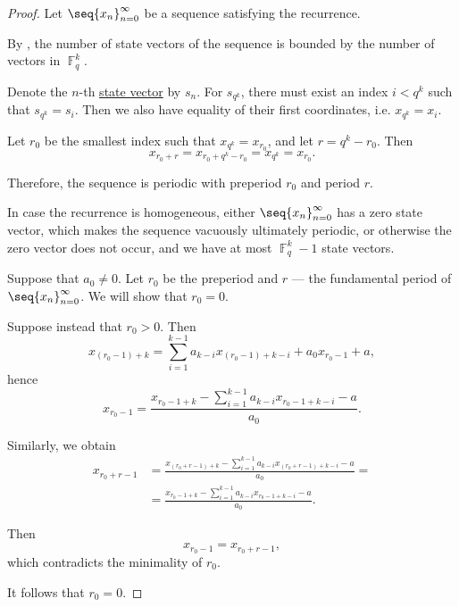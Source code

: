 \begin{proof}
  Let \( \seq{ x_n }_{n=0}^\infty \) be a sequence satisfying the recurrence.

   By , the number of state vectors of the sequence is bounded by the number of vectors in \( \BbbF_q^k \).

  Denote the \( n \)-th \hyperref[def:recurrence_relation/state]{state vector} by \( s_n \). For \( s_{q^k} \), there must exist an index \( i < q^k \) such that \( s_{q^k} = s_i \). Then we also have equality of their first coordinates, i.e. \( x_{q^k} = x_i \).

  Let \( r_0 \) be the smallest index such that \( x_{q^k} = x_{r_0} \), and let \( r = q^k - r_0 \). Then
  \begin{equation*}
    x_{r_0 + r} = x_{r_0 + q^k - r_0} = x_{q^k} = x_{r_0}.
  \end{equation*}

  Therefore, the sequence is periodic with preperiod \( r_0 \) and period \( r \).

   In case the recurrence is homogeneous, either \( \seq{ x_n }_{n=0}^\infty \) has a zero state vector, which makes the sequence vacuously ultimately periodic, or otherwise the zero vector does not occur, and we have at most \( \BbbF_q^k - 1 \) state vectors.

   Suppose that \( a_0 \neq 0 \). Let \( r_0 \) be the preperiod and \( r \) --- the fundamental period of \( \seq{ x_n }_{n=0}^\infty \). We will show that \( r_0 = 0 \).

  Suppose instead that \( r_0 > 0 \). Then
  \begin{equation*}
    x_{(r_0-1)+k} = \sum_{i=1}^{k-1} a_{k-i} x_{(r_0-1)+k-i} + a_0 x_{r_0-1} + a,
  \end{equation*}
  hence
  \begin{equation*}
    x_{r_0-1}
    =
    \frac {x_{r_0-1+k} - \sum_{i=1}^{k-1} a_{k-i} x_{r_0-1+k-i} - a} {a_0}.
  \end{equation*}

  Similarly, we obtain
  \begin{align*}
    x_{r_0+r-1}
    &=
    \frac {x_{(r_0+r-1)+k} - \sum_{i=1}^{k-1} a_{k-i} x_{(r_0+r-1)+k-i} - a} {a_0}
    = \\ &=
    \frac {x_{r_0-1+k} - \sum_{i=1}^{k-1} a_{k-i} x_{r_0-1+k-i} - a} {a_0}.
  \end{align*}

  Then
  \begin{equation*}
    x_{r_0-1} = x_{r_0+r-1},
  \end{equation*}
  which contradicts the minimality of \( r_0 \).

  It follows that \( r_0 = 0 \).
\end{proof}

